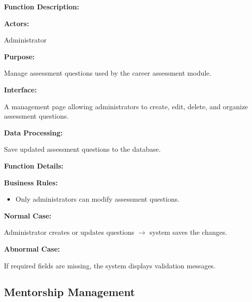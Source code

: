 \textbf{Function Description:}

\textbf{Actors:}

Administrator

\vspace{0.2cm}

\textbf{Purpose:}

Manage assessment questions used by the career assessment module.

\vspace{0.2cm}

\textbf{Interface:}

A management page allowing administrators to create, edit, delete, and organize assessment questions.

\vspace{0.2cm}

\textbf{Data Processing:}

Save updated assessment questions to the database.

\vspace{0.3cm}

\textbf{Function Details:}

\textbf{Business Rules:}

\begin{itemize}
\item Only administrators can modify assessment questions.
\end{itemize}

\textbf{Normal Case:}

Administrator creates or updates questions $\rightarrow$ system saves the changes.

\textbf{Abnormal Case:}

If required fields are missing, the system displays validation messages.

%

\subsection{Mentorship Management}

